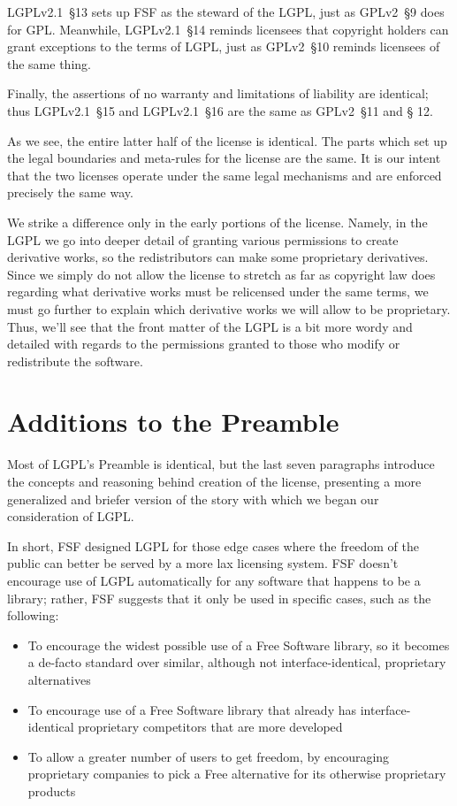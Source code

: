 LGPLv2.1~\S13 sets up FSF as the steward of the LGPL, just as GPLv2~\S9
does for GPL. Meanwhile, LGPLv2.1~\S14 reminds licensees that copyright
holders can grant exceptions to the terms of LGPL, just as GPLv2~\S10
reminds licensees of the same thing.

Finally, the assertions of no warranty and limitations of liability are
identical; thus LGPLv2.1~\S15 and LGPLv2.1~\S16 are the same as GPLv2~\S11 and \S
12.

As we see, the entire latter half of the license is identical.
The parts which set up the legal boundaries and meta-rules for the license
are the same. It is our intent that the two licenses operate under the
same legal mechanisms and are enforced precisely the same way.

We strike a difference only in the early portions of the license.
Namely, in the LGPL we go into deeper detail of granting various permissions to
create derivative works, so the redistributors can make
some proprietary derivatives. Since we simply do not allow the
license to stretch as far as copyright law does regarding what
derivative works must be relicensed under the same terms, we must go
further to explain which derivative works we will allow to be
proprietary. Thus, we'll see that the front matter of the LGPL is a
bit more wordy and detailed with regards to the permissions granted to
those who modify or redistribute the software.

\section{Additions to the Preamble}

Most of LGPL's Preamble is identical, but the last seven paragraphs
introduce the concepts and reasoning behind creation of the license,
presenting a more generalized and briefer version of the story with which
we began our consideration of LGPL\@.

In short, FSF designed LGPL for those edge cases where the freedom of the
public can better be served by a more lax licensing system. FSF doesn't
encourage use of LGPL automatically for any software that happens to be a
library; rather, FSF suggests that it only be used in specific cases, such
as the following:

\begin{itemize}

\item To encourage the widest possible use of a Free Software library, so
  it becomes a de-facto standard over similar, although not
  interface-identical, proprietary alternatives

\item To encourage use of a Free Software library that already has
  interface-identical proprietary competitors that are more developed

\item To allow a greater number of users to get freedom, by encouraging
  proprietary companies to pick a Free alternative for its otherwise
  proprietary products

\end{itemize}


